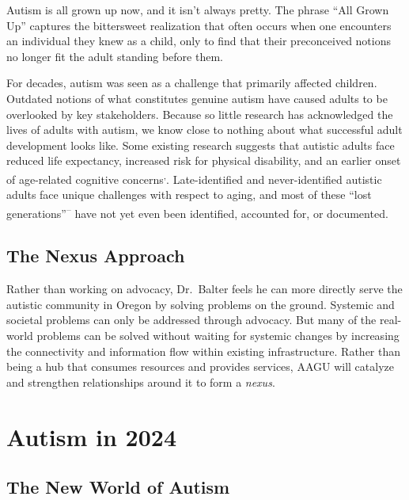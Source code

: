 \documentclass[
  letterpaper,
  DIV=11,
  numbers=noendperiod]{scrreprt}
\begin{document}
Autism is all grown up now, and it isn't always pretty. The phrase ``All
Grown Up'' captures the bittersweet realization that often occurs when
one encounters an individual they knew as a child, only to find that
their preconceived notions no longer fit the adult standing before them.

For decades, autism was seen as a challenge that primarily affected
children. Outdated notions of what constitutes genuine autism have
caused adults to be overlooked by key stakeholders. Because so little
research has acknowledged the lives of adults with autism, we know close
to nothing about what successful adult development looks like. Some
existing research suggests that autistic adults face reduced life
expectancy, increased risk for physical disability, and an earlier onset
of age-related cognitive
concerns\textsuperscript{,}.
Late-identified and never-identified autistic adults face unique
challenges with respect to aging, and most of these ``lost
generations''\textsuperscript{--}
have not yet even been identified, accounted for, or documented.

\section{The Nexus Approach}\label{sec-ex_sum_nexus}

Rather than working on advocacy, Dr.~Balter feels he can more directly
serve the autistic community in Oregon by solving problems on the
ground. Systemic and societal problems can only be addressed through
advocacy. But many of the real-world problems can be solved without
waiting for systemic changes by increasing the connectivity and
information flow within existing infrastructure. Rather than being a hub
that consumes resources and provides services, AAGU will catalyze and
strengthen relationships around it to form a \emph{nexus}.


\chapter{Autism in 2024}\label{sec-autism2024}

\section{The New World of Autism}\label{the-new-world-of-autism}
\end{document}
